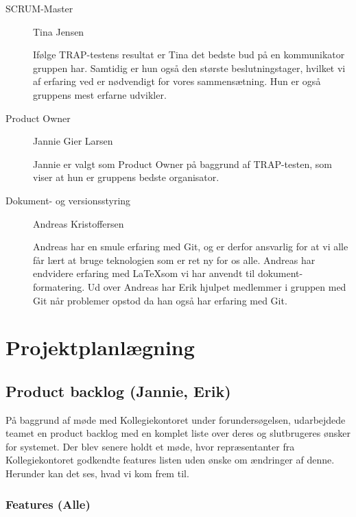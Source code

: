 \documentclass[12pt, a4paper]{report}
\begin{document}
\begin{description}

\item[SCRUM-Master] Tina Jensen

Ifølge TRAP-testens resultat er Tina det bedste bud på en kommunikator gruppen har. Samtidig er hun også den største beslutningstager, hvilket vi af erfaring ved er nødvendigt for vores sammensætning. Hun er også gruppens mest erfarne udvikler.

\item[Product Owner] Jannie Gier Larsen

Jannie er valgt som Product Owner på baggrund af TRAP-testen, som viser at hun er gruppens bedste organisator.

\item[Dokument- og versionsstyring] Andreas Kristoffersen

Andreas har en smule erfaring med Git, og er derfor ansvarlig for at vi alle får lært at bruge teknologien som er ret ny for os alle. Andreas har endvidere erfaring med \LaTeX som vi har anvendt til dokument-formatering. Ud over Andreas har Erik hjulpet medlemmer i gruppen med Git når problemer opstod da han også har erfaring med Git.

\end{description}

\section{Projektplanlægning}

\subsection{Product backlog (Jannie, Erik)}

På baggrund af møde med Kollegiekontoret under forundersøgelsen, udarbejdede teamet en product backlog med en komplet liste over deres og slutbrugeres ønsker for systemet. Der blev senere holdt et møde, hvor repræsentanter fra Kollegiekontoret godkendte features listen uden ønske om ændringer af denne. Herunder kan det ses, hvad vi kom frem til.

\subsubsection{Features (Alle)}
\end{document}
